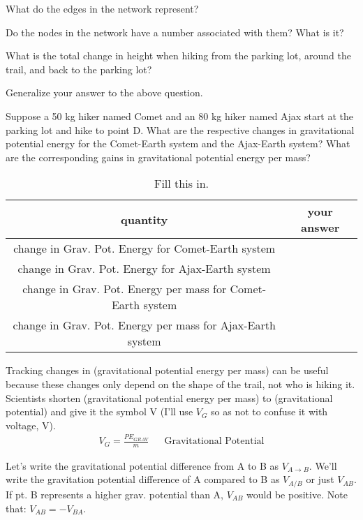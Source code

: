 \begin{alevel}
What do the edges in the network represent?
\end{alevel}
\begin{blevel}
Do the nodes in the network have a number associated with them? What is it?
\end{blevel}
\begin{alevel}
What is the total change in height when hiking from the parking lot, around the trail, and back to the parking lot?
\end{alevel}
\begin{blevel}
Generalize your answer to the above question.
\end{blevel}
\begin{blevel}
Suppose a 50 kg hiker named Comet and an 80 kg hiker named Ajax start at the parking lot and hike to point D. What are the respective changes in gravitational potential energy for the Comet-Earth system and the Ajax-Earth system? What are the corresponding gains in gravitational potential energy per mass?
\end{blevel}

\begin{table}[H]
\begin{tabular}{|c|c|} \hline
quantity&your answer\\ \hline
change in Grav. Pot. Energy for Comet-Earth system& \\ \hline
change in Grav. Pot. Energy for Ajax-Earth system& \\ \hline
change in Grav. Pot. Energy per mass for Comet-Earth system& \\ \hline
change in Grav. Pot. Energy per mass for Ajax-Earth system& \\ \hline
\end{tabular}
\caption{Fill this in.}
\end{table}

Tracking changes in (gravitational potential energy per mass) can be useful because these changes only depend on the shape of the trail, not who is hiking it. Scientists shorten (gravitational potential energy per mass) to (gravitational potential) and give it the symbol V (I'll use $V_G$ so as not to confuse it with voltage, V).
\begin{align}
V_G=\frac{PE_{GRAV}}{m}&&\text{Gravitational Potential} \label{E:2GP}
\end{align}

Let's write the gravitational potential difference from A to B as $V_{A \rightarrow B}$. We'll write the gravitation potential difference of A compared to B as $V_{A/B}$ or just $V_{AB}$.  If pt. B represents a higher grav. potential than A, $V_{AB}$ would be positive. Note that: $V_{AB}=-V_{BA}$.

